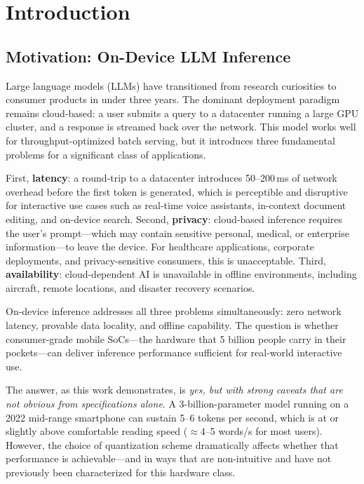\documentclass[conference]{IEEEtran}
\begin{document}
\section{Introduction}

\subsection{Motivation: On-Device LLM Inference}

Large language models (LLMs) have transitioned from research curiosities to
consumer products in under three years. The dominant deployment paradigm remains
cloud-based: a user submits a query to a datacenter running a large GPU cluster,
and a response is streamed back over the network. This model works well for
throughput-optimized batch serving, but it introduces three fundamental problems
for a significant class of applications.

First, \textbf{latency}: a round-trip to a datacenter introduces 50--200\,ms of
network overhead before the first token is generated, which is perceptible and
disruptive for interactive use cases such as real-time voice assistants,
in-context document editing, and on-device search. Second, \textbf{privacy}:
cloud-based inference requires the user's prompt---which may contain sensitive
personal, medical, or enterprise information---to leave the device. For healthcare
applications, corporate deployments, and privacy-sensitive consumers, this is
unacceptable. Third, \textbf{availability}: cloud-dependent AI is unavailable
in offline environments, including aircraft, remote locations, and disaster
recovery scenarios.

On-device inference addresses all three problems simultaneously: zero network
latency, provable data locality, and offline capability. The question is whether
consumer-grade mobile SoCs---the hardware that 5 billion people carry in their
pockets---can deliver inference performance sufficient for real-world interactive
use.

The answer, as this work demonstrates, is \emph{yes, but with strong caveats
that are not obvious from specifications alone}. A 3-billion-parameter model
running on a 2022 mid-range smartphone can sustain 5--6 tokens per second,
which is at or slightly above comfortable reading speed ($\approx$4--5 words/s
for most users). However, the choice of quantization scheme dramatically affects
whether that performance is achievable---and in ways that are non-intuitive
and have not previously been characterized for this hardware class.
\end{document}
